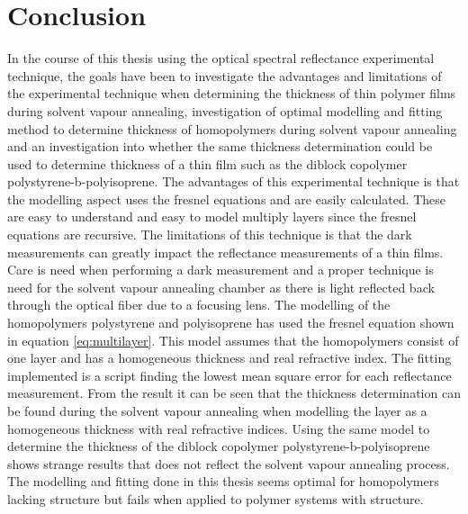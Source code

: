 \documentclass[MasterThesisMain.tex]{subfiles}
\begin{document}
\chapter{Conclusion} \label{ch:conclusion}
In the course of this thesis using the optical spectral reflectance experimental technique, the goals have been to investigate the advantages and limitations of the experimental technique when determining the thickness of thin polymer films during solvent vapour annealing, investigation of optimal modelling and fitting method to determine thickness of homopolymers during solvent vapour annealing and an investigation into whether the same thickness determination could be used to determine thickness of a thin film such as the diblock copolymer polystyrene-b-polyisoprene. The advantages of this experimental technique is that the modelling aspect uses the fresnel equations and are easily calculated. These are easy to understand and easy to model multiply layers since the fresnel equations are recursive. The limitations of this technique is that the dark measurements can greatly impact the reflectance measurements of a thin films. Care is need when performing a dark measurement and a proper technique is need for the solvent vapour annealing chamber as there is light reflected back through the optical fiber due to a focusing lens. The modelling of the homopolymers polystyrene and polyisoprene has used the fresnel equation shown in equation \ref{eq:multilayer}. This model assumes that the homopolymers consist of one layer and has a homogeneous thickness and real refractive index. The fitting implemented is a script finding the lowest mean square error for each reflectance measurement. From the result it can be seen that the thickness determination can be found during the solvent vapour annealing when modelling the layer as a homogeneous thickness with real refractive indices. Using the same model to determine the thickness of the diblock copolymer polystyrene-b-polyisoprene shows strange results that does not reflect the solvent vapour annealing process. The modelling and fitting done in this thesis seems optimal for homopolymers lacking structure but fails when applied to polymer systems with structure.     
\end{document}
